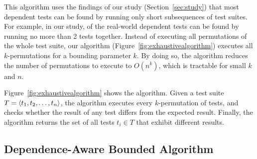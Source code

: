 
This algorithm uses the findings of our study
(Section~\ref{sec:study})
that most dependent tests can be found by running only short
subsequences of test suites. For example,
in our study, \pertange of the real-world dependent tests
can be found by running no more than 2 tests together.
Instead of executing all permutations of the
whole test suite, our algorithm (Figure~\ref{fig:exhaustivealgorithm})
executes all $k$-permutations for a bounding
parameter $k$.
By doing so, the algorithm reduces
the number of permutations to execute
to $O(n^k)$, which is tractable for small $k$ and $n$. 


Figure~\ref{fig:exhaustivealgorithm} shows the algorithm.
Given a test suite $T =  \langle t_1, t_2, \ldots, t_n \rangle $, the
algorithm executes every $k$-permutation of tests,
and checks whether the result of any test differs
from the expected result. Finally, the algorithm returns the set
of all tests $t_i \in T$
that exhibit different results.





\subsection{Dependence-Aware Bounded Algorithm}
\label{sec:advalgorithm}

